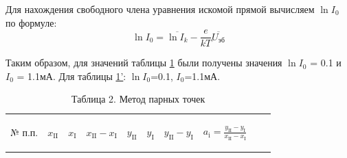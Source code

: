 Для нахождения свободного члена уравнения искомой прямой вычисляем $\ln I_0$ по формуле:
\begin{equation}
    \ln I_0=\overline{\ln I_k}-\frac{e}{kT}\overline{U_{\text{эб}}}
\end{equation}

Таким образом, для значений таблицы \hyperref[tab:1]{1} были получены значения $\ln I_0$ = 0.1 и $I_0$ = 1.1мА. Для таблицы \hyperref[tab:1]{1'}: $\ln I_0$=0.1, $I_0$=1.1мА.

\begin{center}
\begin{table}[H]
\centering
\caption*{Таблица 2. Метод парных точек}
\label{tabl:3}
\begin{tabular}{|c|c|c|c|c|c|c|c|c|c|}
\hline
\begin{minipage}{7mm}
    № п.п. 
\end{minipage}&
\begin{minipage}{7mm}
   \begin{center} $x_{\text{II}}$ \end{center} 
\end{minipage} &
\begin{minipage}{7mm}
   \begin{center} $x_{\text{I}}$ \end{center} 
\end{minipage} &
\begin{minipage}{14mm}
   \begin{center} $x_{\text{II}}-x_{\text{I}}$ \end{center} 
\end{minipage}&
\begin{minipage}{7mm}
   \begin{center} $y_{\text{II}}$ \end{center} 
\end{minipage}&
\begin{minipage}{7mm}
   \begin{center} $y_{\text{I}}$ \end{center} 
\end{minipage}&
\begin{minipage}{14mm}
   \begin{center} $y_{\text{II}}-y_{\text{I}}$ \end{center} 
\end{minipage}&
\begin{minipage}{25mm}
   \begin{center} $a_{\text{i}}=\frac{y_{\text{II}}-y_{\text{I}}}{x_{\text{II}}-x_{\text{I}}}$ \end{center} 

\end{minipage}
\end{tabular}
\end{table}
\end{center}

